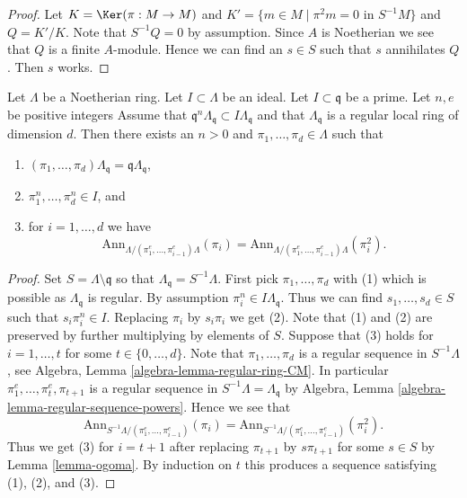 \begin{proof}
Let $K = \Ker(\pi : M \to M)$ and
$K' = \{m \in M \mid \pi^2 m = 0\text{ in }S^{-1}M\}$ and
$Q = K'/K$. Note that $S^{-1}Q = 0$ by assumption. Since $A$
is Noetherian we see that $Q$ is a finite $A$-module.
Hence we can find an $s \in S$ such that $s$ annihilates $Q$.
Then $s$ works.
\end{proof}

\begin{lemma}
\label{lemma-find-sequence}
Let $\Lambda$ be a Noetherian ring. Let $I \subset \Lambda$ be an ideal.
Let $I \subset \mathfrak q$ be a prime. Let $n, e$ be positive integers
Assume that $\mathfrak q^n\Lambda_\mathfrak q \subset I\Lambda_\mathfrak q$
and that $\Lambda_\mathfrak q$ is a regular local ring of dimension $d$.
Then there exists an $n > 0$ and
$\pi_1, \ldots, \pi_d \in \Lambda$ such that
\begin{enumerate}
\item $(\pi_1, \ldots, \pi_d)\Lambda_\mathfrak q =
\mathfrak q\Lambda_\mathfrak q$,
\item $\pi_1^n, \ldots, \pi_d^n \in I$, and
\item for $i = 1, \ldots, d$ we have
$$
\text{Ann}_{\Lambda/(\pi_1^e, \ldots, \pi_{i - 1}^e)\Lambda}(\pi_i) =
\text{Ann}_{\Lambda/(\pi_1^e, \ldots, \pi_{i - 1}^e)\Lambda}(\pi_i^2).
$$
\end{enumerate}
\end{lemma}

\begin{proof}
Set $S = \Lambda \setminus \mathfrak q$ so that
$\Lambda_\mathfrak q = S^{-1}\Lambda$.
First pick $\pi_1, \ldots, \pi_d$ with (1) which is possible
as $\Lambda_\mathfrak q$ is regular. By assumption
$\pi_i^n \in I\Lambda_\mathfrak q$. Thus we can find
$s_1, \ldots, s_d \in S$ such that $s_i\pi_i^n \in I$.
Replacing $\pi_i$ by $s_i\pi_i$ we get (2).
Note that (1) and (2) are preserved by further multiplying by elements of $S$.
Suppose that (3) holds for $i = 1, \ldots, t$ for some
$t \in \{0, \ldots, d\}$. Note that
$\pi_1, \ldots, \pi_d$ is a regular sequence in $S^{-1}\Lambda$, see
Algebra, Lemma \ref{algebra-lemma-regular-ring-CM}.
In particular $\pi_1^e, \ldots, \pi_t^e, \pi_{t + 1}$ is a
regular sequence in $S^{-1}\Lambda = \Lambda_\mathfrak q$ by
Algebra, Lemma \ref{algebra-lemma-regular-sequence-powers}.
Hence we see that
$$
\text{Ann}_{S^{-1}\Lambda/(\pi_1^e, \ldots, \pi_{i - 1}^e)}(\pi_i) =
\text{Ann}_{S^{-1}\Lambda/(\pi_1^e, \ldots, \pi_{i - 1}^e)}(\pi_i^2).
$$
Thus we get (3) for $i = t + 1$ after replacing $\pi_{t + 1}$ by $s\pi_{t + 1}$
for some $s \in S$ by Lemma \ref{lemma-ogoma}. By induction on $t$ this
produces a sequence satisfying (1), (2), and (3).
\end{proof}

